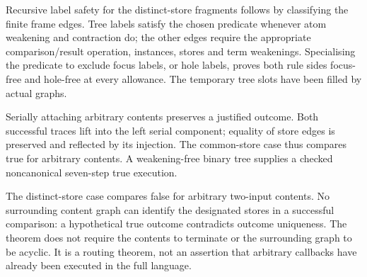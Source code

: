 
Recursive label safety for the distinct-store fragments follows
by classifying the finite frame edges. Tree labels satisfy the chosen
predicate whenever atom weakening and contraction do; the other edges
require the appropriate comparison/result operation, instances, stores
and term weakenings. Specialising the predicate to exclude focus labels,
or hole labels, proves both rule sides focus-free and hole-free at every
allowance. The temporary tree slots have been filled by actual graphs.





Serially attaching arbitrary contents preserves a justified outcome.
Both successful traces lift into the left serial component; equality of
store edges is preserved and reflected by its injection. The common-store
case thus compares true for arbitrary contents. A weakening-free binary
tree supplies a checked noncanonical seven-step true execution.




The distinct-store case compares false for arbitrary two-input contents.
No surrounding content graph can identify the designated stores in a
successful comparison: a hypothetical true outcome contradicts outcome
uniqueness. The theorem does not require the contents to terminate or the
surrounding graph to be acyclic. It is a routing theorem, not an assertion
that arbitrary callbacks have already been executed in the full language.



